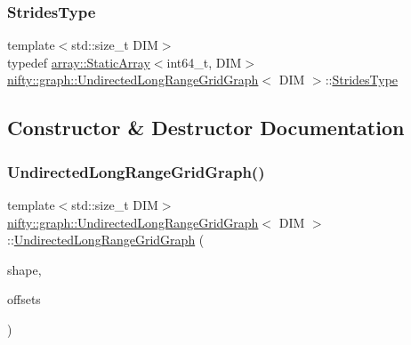 \subsubsection{\texorpdfstring{Strides\+Type}{StridesType}}
{\footnotesize\ttfamily template$<$std\+::size\+\_\+t D\+IM$>$ \\
typedef \hyperlink{namespacenifty_1_1array_a683f151f19c851754e0c6d55ed16a0c2}{array\+::\+Static\+Array}$<$int64\+\_\+t, D\+IM$>$ \hyperlink{classnifty_1_1graph_1_1UndirectedLongRangeGridGraph}{nifty\+::graph\+::\+Undirected\+Long\+Range\+Grid\+Graph}$<$ D\+IM $>$\+::\hyperlink{classnifty_1_1graph_1_1UndirectedLongRangeGridGraph_a93409ee0bdff70a63b80bc8d4a126240}{Strides\+Type}}



\subsection{Constructor \& Destructor Documentation}
\mbox{\label{classnifty_1_1graph_1_1UndirectedLongRangeGridGraph_a6dc33ffd84f88fe4e15c463e51435e07}} 
\subsubsection{\texorpdfstring{Undirected\+Long\+Range\+Grid\+Graph()}{UndirectedLongRangeGridGraph()}}
{\footnotesize\ttfamily template$<$std\+::size\+\_\+t D\+IM$>$ \\
\hyperlink{classnifty_1_1graph_1_1UndirectedLongRangeGridGraph}{nifty\+::graph\+::\+Undirected\+Long\+Range\+Grid\+Graph}$<$ D\+IM $>$\+::\hyperlink{classnifty_1_1graph_1_1UndirectedLongRangeGridGraph}{Undirected\+Long\+Range\+Grid\+Graph} (\begin{DoxyParamCaption}\item[{const \hyperlink{classnifty_1_1graph_1_1UndirectedLongRangeGridGraph_a59b2f5f607a442d6aedb1ddd5ca53d50}{Shape\+Type} \&}]{shape,  }\item[{const \hyperlink{classnifty_1_1graph_1_1UndirectedLongRangeGridGraph_a74078f6c712f2f257bfbfd62c7d8b902}{Offset\+Vector} \&}]{offsets }\end{DoxyParamCaption})\hspace{0.3cm}{\ttfamily [inline]}}



